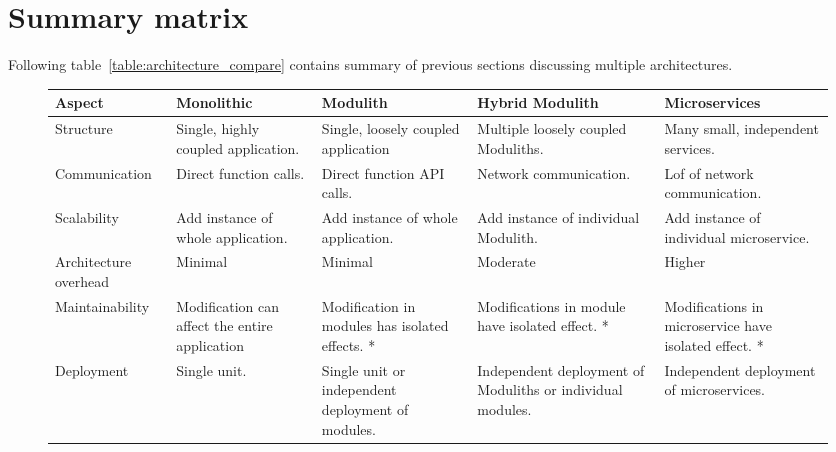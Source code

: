 \section{Summary matrix}
Following table~\ref{table:architecture_compare} contains summary of previous sections discussing multiple architectures.


\begin{sidewaysfigure}
    \begin{tabular}{ |p{2.7cm}|p{3cm}|p{3cm}|p{4cm}|p{3cm}| }
        \hline
        \textbf{Aspect}       & \textbf{Monolithic}                            & \textbf{Modulith}                                    & \textbf{Hybrid Modulith}                                   & \textbf{Microservices}                                \\
        \hline
        Structure             & Single, highly coupled   application.          & Single, loosely coupled application                  & Multiple loosely coupled Moduliths.                        & Many small, independent services.                     \\
        \hline
        Communication         & Direct function calls.                         & Direct function API calls.                           & Network communication.                                     & Lof of network communication.                         \\
        \hline
        Scalability           & Add instance of whole application.             & Add instance of whole application.                   & Add instance of individual Modulith.                       & Add instance of individual microservice.              \\
        \hline
        Architecture overhead & Minimal                                        & Minimal                                              & Moderate                                                   & Higher                                                \\
        \hline
        Maintainability       & Modification can affect the entire application & Modification in modules has isolated effects. *      & Modifications in module have isolated effect. *            & Modifications in microservice have isolated effect. * \\
        \hline
        Deployment            & Single unit.                                   & Single unit or independent deployment of modules.    & Independent deployment of Moduliths or individual modules. & Independent deployment of microservices.              \\

\end{tabular}
\end{sidewaysfigure}
